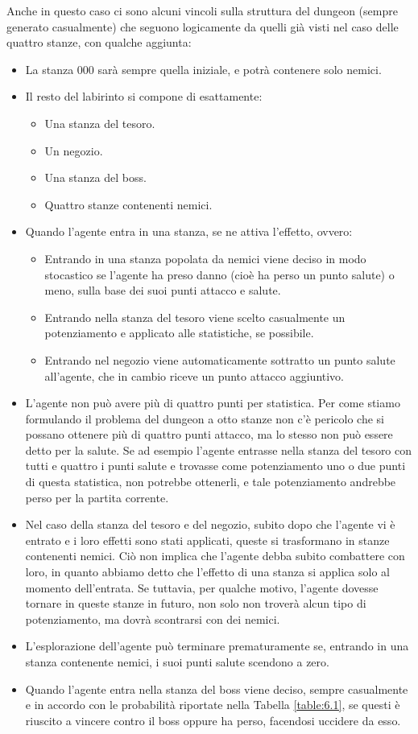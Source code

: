 \documentclass{book}
\theoremstyle{definition}
\theoremstyle{definition}
\theoremstyle{definition}
\theoremstyle{plain}
\theoremstyle{plain}
\theoremstyle{plain}
\theoremstyle{plain}
\begin{document}
\noindent Anche in questo caso ci sono alcuni vincoli sulla struttura del dungeon (sempre generato casualmente) che seguono logicamente da quelli già visti nel caso delle quattro stanze, con qualche aggiunta:
\begin{itemize}
    \item La stanza 000 sarà sempre quella iniziale, e potrà contenere solo nemici.
    \item Il resto del labirinto si compone di esattamente:
    \begin{itemize}
        \item Una stanza del tesoro.
        \item Un negozio.
        \item Una stanza del boss.
        \item Quattro stanze contenenti nemici.
    \end{itemize}
    \item Quando l'agente entra in una stanza, se ne attiva l'effetto, ovvero:
    \begin{itemize}
        \item Entrando in una stanza popolata da nemici viene deciso in modo stocastico se l'agente ha preso danno (cioè ha perso un punto salute) o meno, sulla base dei suoi punti attacco e salute.
        \item Entrando nella stanza del tesoro viene scelto casualmente un potenziamento e applicato alle statistiche, se possibile.
        \item Entrando nel negozio viene automaticamente sottratto un punto salute all'agente, che in cambio riceve un punto attacco aggiuntivo.
    \end{itemize} 
    \item L'agente non può avere più di quattro punti per statistica. Per come stiamo formulando il problema del dungeon a otto stanze non c'è pericolo che si possano ottenere più di quattro punti attacco, ma lo stesso non può essere detto per la salute. Se ad esempio l'agente entrasse nella stanza del tesoro con tutti e quattro i punti salute e trovasse come potenziamento uno o due punti di questa statistica, non potrebbe ottenerli, e tale potenziamento andrebbe perso per la partita corrente.
    \item Nel caso della stanza del tesoro e del negozio, subito dopo che l'agente vi è entrato e i loro effetti sono stati applicati, queste si trasformano in stanze contenenti nemici. Ciò non implica che l'agente debba subito combattere con loro, in quanto abbiamo detto che l'effetto di una stanza si applica solo al momento dell'entrata. Se tuttavia, per qualche motivo, l'agente dovesse tornare in queste stanze in futuro, non solo non troverà alcun tipo di potenziamento, ma dovrà scontrarsi con dei nemici.
    \item L'esplorazione dell'agente può terminare prematuramente se, entrando in una stanza contenente nemici, i suoi punti salute scendono a zero.
    \item Quando l'agente entra nella stanza del boss viene deciso, sempre casualmente e in accordo con le probabilità riportate nella Tabella \ref{table:6.1}, se questi è riuscito a vincere contro il boss oppure ha perso, facendosi uccidere da esso. 
\end{itemize}
\end{document}
